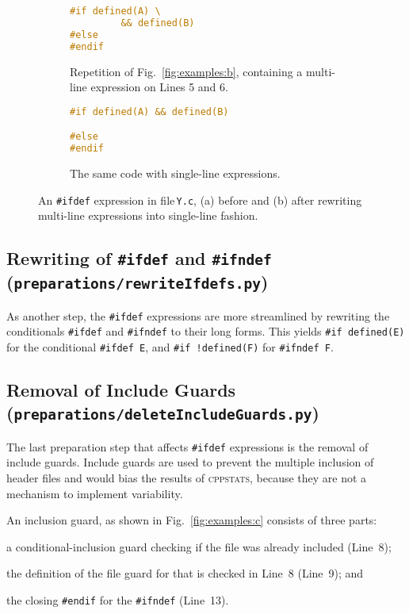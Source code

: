 \documentclass[a4paper]{scrartcl}
\newcommand\code[1]{\texttt{#1}}
\newcommand\tool[1]{\textsc{#1}}
\newcommand\ifdeff[1]{\code{\##1}\xspace}
\newcommand\ifdef[0]{{\upshape\ifdeff{ifdef}}\xspace}
\newcommand\cppstats[0]{\tool{cppstats}\xspace}
\begin{document}
\begin{figure}[ht]
  \centering
  \begin{subfigure}[b]{0.45\textwidth}
		\begin{lstlisting}[language=C, firstnumber=5]
#if defined(A) \
		 && defined(B)
#else 
#endif
		\end{lstlisting}
		\caption{Repetition of Fig.\ \ref{fig:examples:b}, containing a multi-line expression on Lines 5 and 6.}
		\label{fig:multiline:a}
  \end{subfigure}
  \hfill
  \begin{subfigure}[b]{0.45\textwidth}
		\begin{lstlisting}[language=C, firstnumber=5]
#if defined(A) && defined(B)

#else 
#endif
		\end{lstlisting}
		\caption{The same code with single-line expressions.}
		\label{fig:multiline:b}
  \end{subfigure}
  
  \caption{An \ifdef expression in file\,\code{Y.c}, (a) before and (b) after rewriting multi-line expressions into single-line fashion.}
  
\end{figure}


\subsection{Rewriting of \ifdeff{ifdef} and \ifdeff{ifndef} {\footnotesize (\code{preparations/rewriteIfdefs.py})}}

As another step, the \ifdef expressions are more streamlined by rewriting the conditionals \ifdeff{ifdef} and \ifdeff{ifndef} to their long forms.
This yields \ifdeff{if defined(E)} for the conditional \ifdeff{ifdef E}, and \ifdeff{if\,!defined(F)} for \ifdeff{ifndef F}.


\subsection{Removal of Include Guards {\footnotesize (\code{preparations/deleteIncludeGuards.py})}}

The last preparation step that affects \ifdef expressions is the removal of include guards.
Include guards are used to prevent the multiple inclusion of header files and would bias the results of \cppstats, because they are not a mechanism to implement variability.

An inclusion guard, as shown in Fig.\ \ref{fig:examples:c} consists of three parts:
\begin{inparaenum}[\itshape 1\upshape)]
\item a conditional-inclusion guard checking if the file was already included (Line~8);
\item the definition of the file guard for that is checked in Line~8 (Line~9); and
\item the closing \ifdeff{endif} for the \ifdeff{ifndef} (Line~13).
\end{inparaenum}
\end{document}
